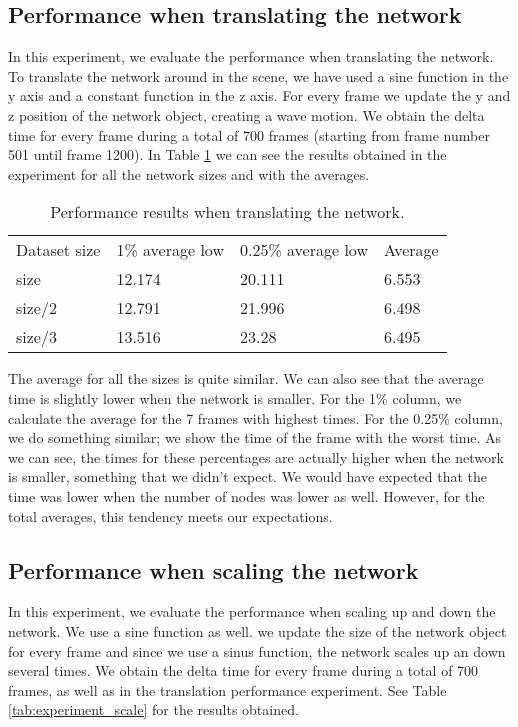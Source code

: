 \subsection{Performance when translating the network}
In this experiment, we evaluate the performance when translating the network. To translate the network around in the scene, we have used a sine function in the y axis and a constant function in the z axis. For every frame we update the y and z position of the network object, creating a wave motion. We obtain the delta time for every frame during a total of 700 frames (starting from frame number 501 until frame 1200). In Table \ref{tab:experiment_moving} we can see the results obtained in the experiment for all the network sizes and with the averages.

\begin{table}[h!]
\centering
\begin{tabular}{llll}
Dataset size & 1\% average low & 0.25\% average low & Average \\
size & 12.174 & 20.111 & 6.553 \\
size/2 & 12.791 & 21.996 & 6.498 \\
size/3 & 13.516 & 23.28 & 6.495 \\
\end{tabular}
\caption{Performance results when translating the network.}
\label{tab:experiment_moving}
\end{table}

The average for all the sizes is quite similar. We can also see that the average time is slightly lower when the network is smaller. For the 1\% column, we calculate the average for the 7 frames with highest times. For the 0.25\% column, we do something similar; we show the time of the frame with the worst time. As we can see, the times for these percentages are actually higher when the network is smaller, something that we didn't expect. We would have expected that the time was lower when the number of nodes was lower as well. However, for the total averages, this tendency meets our expectations.

\subsection{Performance when scaling the network}
In this experiment, we evaluate the performance when scaling up and down the network. We use a sine function as well. we update the size of the network object for every frame and since we use a sinus function, the network scales up an down several times. We obtain the delta time for every frame during a total of 700 frames, as well as in the translation performance experiment. See Table \ref{tab:experiment_scale} for the results obtained.

